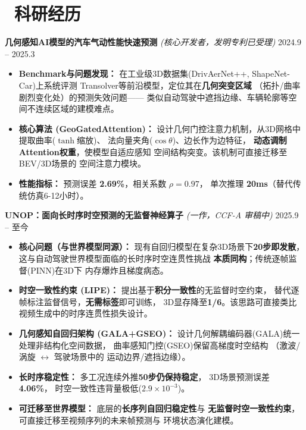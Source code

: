 \documentclass[11pt]{article}
\newlength{\interProjectSpacing}
\newcommand{\projectsep}{\vspace{\interProjectSpacing}}
\begin{document}

\section{\makebox[\widthof{\faUsers}][c]{\color{CVBlue}\faUsers}\ 
科研经历}
\textbf{几何感知AI模型的汽车气动性能快速预测} 
\textit{(核心开发者，发明专利已受理)} 
\hfill 2024.9 -- 2025.3
\begin{itemize}
    \item \textbf{Benchmark与问题发现：}
      在工业级3D数据集(DrivAerNet++, ShapeNet-Car)上系统评测
      Transolver等前沿模型，定位其在\textbf{几何突变区域}
      （拓扑/曲率剧烈变化处）的预测失效问题——
      类似自动驾驶中遮挡边缘、车辆轮廓等空间不连续区域的建模难点。
    \item \textbf{核心算法 (GeoGatedAttention)：}
      设计几何门控注意力机制，从3D网格中提取曲率($\tanh$缩放)、
      法向量夹角($\cos\theta$)、边长作为边特征，
      \textbf{动态调制Attention权重}，使模型自适应感知
      空间结构突变。该机制可直接迁移至BEV/3D场景的
      空间注意力模块。
    \item \textbf{性能指标：}
      预测误差 \textbf{2.69\%}，相关系数 $\rho{=}0.97$，
      单次推理 \textbf{20ms}（替代传统仿真6-12小时）。
\end{itemize}

\projectsep

\textbf{UNOP：面向长时序时空预测的无监督神经算子} 
\textit{(一作，CCF-A 审稿中)} 
\hfill 2025.9 -- 至今
\begin{itemize}
    \item \textbf{核心问题（与世界模型同源）：}
      现有自回归模型在复杂3D场景下\textbf{20步即发散}，
      这与自动驾驶世界模型面临的长时序时空连贯性挑战
      \textbf{本质同构}；传统逐帧监督(PINN)在3D下
      内存爆炸且梯度病态。
    \item \textbf{时空一致性约束 (LIPE)：}
      提出基于\textbf{积分一致性}的无监督时空约束，
      替代逐帧标注监督信号，\textbf{无需标签}即可训练，
      3D显存降至\textbf{1/6}。该思路可直接类比
      视频生成中的时序连贯性损失设计。
    \item \textbf{几何感知自回归架构 (GALA+GSEO)：}
      设计几何解耦编码器(GALA)统一处理非结构化空间数据，
      曲率感知门控(GSEO)保留高梯度时空结构
      （激波/涡旋 $\leftrightarrow$ 驾驶场景中的
      运动边界/遮挡边缘）。
    \item \textbf{长时序稳定性：}
      多工况连续外推\textbf{50步仍保持稳定}，
      3D场景预测误差 \textbf{4.06\%}，
      时空一致性违背量极低($2.9{\times}10^{-3}$)。
    \item \textbf{可迁移至世界模型：}
      底层的\textbf{长序列自回归稳定性}与
      \textbf{无监督时空一致性约束}，
      可直接迁移至视频序列的未来帧预测与
      环境状态演化建模。
\end{itemize}
\end{document}
